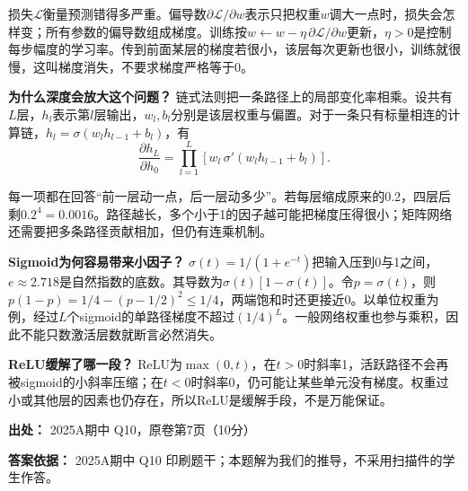 损失\(\mathcal L\)衡量预测错得多严重。偏导数\(\partial\mathcal L/\partial w\)表示只把权重\(w\)调大一点时，损失会怎样变；所有参数的偏导数组成梯度。训练按\(w\leftarrow w-\eta\,\partial\mathcal L/\partial w\)更新，\(\eta>0\)是控制每步幅度的学习率。传到前面某层的梯度若很小，该层每次更新也很小，训练就很慢，这叫梯度消失，不要求梯度严格等于0。


\textbf{为什么深度会放大这个问题？} 链式法则把一条路径上的局部变化率相乘。设共有\(L\)层，\(h_l\)表示第\(l\)层输出，\(w_l,b_l\)分别是该层权重与偏置。对于一条只有标量相连的计算链，\(h_l=\sigma(w_lh_{l-1}+b_l)\)，有
\[
\frac{\partial h_L}{\partial h_0}
=\prod_{l=1}^{L}\left[w_l\,\sigma'(w_lh_{l-1}+b_l)\right].
\]


每一项都在回答“前一层动一点，后一层动多少”。若每层缩成原来的0.2，四层后剩\(0.2^4=0.0016\)。路径越长，多个小于1的因子越可能把梯度压得很小；矩阵网络还需要把多条路径贡献相加，但仍有连乘机制。


\textbf{Sigmoid为何容易带来小因子？} \(\sigma(t)=1/(1+e^{-t})\)把输入压到0与1之间，\(e\approx2.718\)是自然指数的底数。其导数为\(\sigma(t)[1-\sigma(t)]\)。令\(p=\sigma(t)\)，则\(p(1-p)=1/4-(p-1/2)^2\le1/4\)，两端饱和时还更接近0。以单位权重为例，经过\(L\)个sigmoid的单路径梯度不超过\((1/4)^L\)。一般网络权重也参与乘积，因此不能只数激活层数就断言必然消失。


\textbf{ReLU缓解了哪一段？} ReLU为\(\max(0,t)\)，在\(t>0\)时斜率1，活跃路径不会再被sigmoid的小斜率压缩；在\(t<0\)时斜率0，仍可能让某些单元没有梯度。权重过小或其他层的因素也仍存在，所以ReLU是缓解手段，不是万能保证。


\textbf{出处：} 2025A期中 Q10，原卷第7页（10分）


\textbf{答案依据：} 2025A期中 Q10 印刷题干；本题解为我们的推导，不采用扫描件的学生作答。

